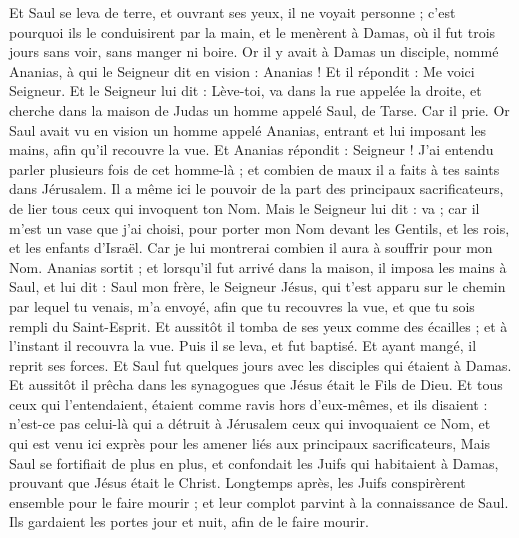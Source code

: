 \begin{multicols}{2}
Et Saul se leva de terre, et ouvrant ses yeux, il ne voyait personne ; c'est pourquoi ils le conduisirent par la main, et le menèrent à Damas,
où il fut trois jours sans voir, sans manger ni boire.
Or il y avait à Damas un disciple, nommé Ananias, à qui le Seigneur dit en vision : Ananias ! Et il répondit : Me voici Seigneur.
Et le Seigneur lui dit : Lève-toi, va dans la rue appelée la droite, et cherche dans la maison de Judas un homme appelé Saul, de Tarse.
Car il prie. Or Saul avait vu en vision un homme appelé Ananias, entrant et lui imposant les mains, afin qu'il recouvre la vue.
Et Ananias répondit : Seigneur ! J'ai entendu parler plusieurs fois de cet homme-là ; et combien de maux il a faits à tes saints dans Jérusalem.
Il a même ici le pouvoir de la part des principaux sacrificateurs, de lier tous ceux qui invoquent ton Nom.
 Mais le Seigneur lui dit : va ; car il m'est un vase que j'ai choisi, pour porter mon Nom devant les Gentils, et les rois, et les enfants d'Israël.
Car je lui montrerai combien il aura à souffrir pour mon Nom.
Ananias sortit ; et lorsqu'il fut arrivé dans la maison, il imposa les mains à Saul, et lui dit : Saul mon frère, le Seigneur Jésus, qui t'est apparu sur le chemin par lequel tu venais, m'a envoyé, afin que tu recouvres la vue, et que tu sois rempli du Saint-Esprit.
Et aussitôt il tomba de ses yeux comme des écailles ; et à l'instant il recouvra la vue. Puis il se leva, et fut baptisé.
Et ayant mangé, il reprit ses forces. Et Saul fut quelques jours avec les disciples qui étaient à Damas.
Et aussitôt il prêcha dans les synagogues que Jésus était le Fils de Dieu.
Et tous ceux qui l'entendaient, étaient comme ravis hors d'eux-mêmes, et ils disaient : n'est-ce pas celui-là qui a détruit à Jérusalem ceux qui invoquaient ce Nom, et qui est venu ici exprès pour les amener liés aux principaux sacrificateurs,
Mais Saul se fortifiait de plus en plus, et confondait les Juifs qui habitaient à Damas, prouvant que Jésus était le Christ.
Longtemps après, les Juifs conspirèrent ensemble pour le faire mourir ;
et leur complot parvint à la connaissance de Saul. Ils gardaient les portes jour et nuit, afin de le faire mourir.

\end{multicols}
